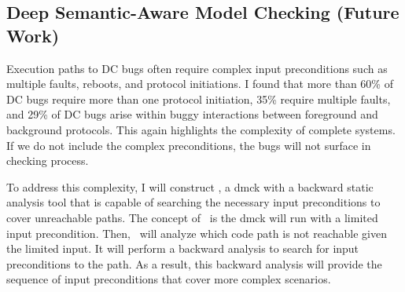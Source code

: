 \documentclass[11pt]{article}
\begin{document}
\subsection{Deep Semantic-Aware Model Checking (Future Work)}

Execution paths to DC bugs often require complex input preconditions such as
multiple faults, reboots, and protocol initiations. I found that more than 60\%
of DC bugs require more than one protocol initiation, 35\% require multiple
faults, and 29\% of DC bugs arise within buggy interactions between foreground
and background protocols.  This again highlights the complexity of complete
systems. If we do not include the complex preconditions, the bugs will not
surface in checking process.

To address this complexity, I will construct \deepcheck, a dmck with a backward
static analysis tool that is capable of searching the necessary input
preconditions to cover unreachable paths. The concept of \deepcheck\ is the dmck
will run with a limited input precondition. Then, \deepcheck\ will analyze which
code path is not reachable given the limited input. It will perform a backward
analysis to search for input preconditions to the path. As a result, this
backward analysis will provide the sequence of input preconditions that cover
more complex scenarios.


\end{document}
